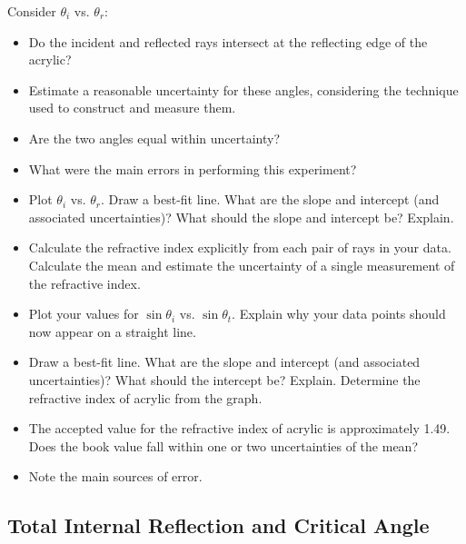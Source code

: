 Consider $\theta_{i}$ vs. $\theta_{r}$:
\begin{itemize}
	\item Do the incident and reflected rays intersect at the reflecting edge of the acrylic? 
	\item Estimate a reasonable uncertainty for these angles, considering the technique used to construct and measure them.
	\item Are the two angles equal within uncertainty?
	\item What were the main errors in performing this experiment?
	\item Plot $\theta_{i}$ vs. $\theta_{r}$.  Draw a best-fit line. What are the slope and intercept (and associated uncertainties)?  What should the slope and intercept be?  Explain.
\end{itemize}
\myskip

\begin{itemize}
    \item   	Calculate the refractive index explicitly from each pair of rays in your data.  Calculate the mean and estimate the uncertainty of a single measurement of the refractive index.
    \item   	Plot your values for $\sin \theta_{i}$ vs. $\sin \theta_{t}$.  Explain why your data points should now appear on a straight line.
    \item   	Draw a best-fit line. What are the slope and intercept (and associated uncertainties)?  What should the intercept be?  Explain. Determine the refractive index of acrylic from the graph. 
    \item   	The accepted value for the refractive index of acrylic is approximately 1.49. Does the book value fall within one or two uncertainties of the mean?
    \item   	Note the main sources of error.
\end{itemize}
 
\subsection{Total Internal Reflection and Critical Angle}

